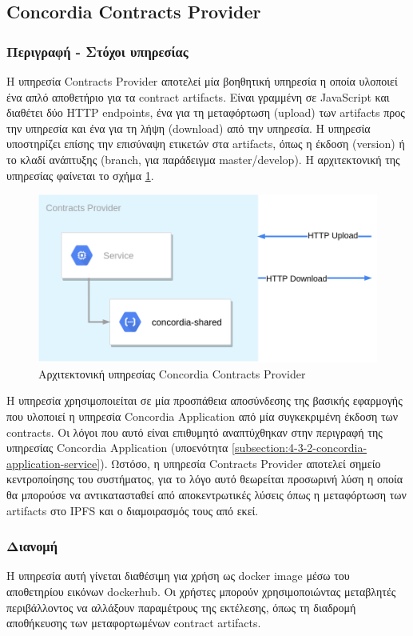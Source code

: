 \subsection{Concordia Contracts Provider} \label{subsection:4-3-5-concordia-contracts-provider-service}

\subsubsection{Περιγραφή - Στόχοι υπηρεσίας}

Η υπηρεσία Contracts Provider αποτελεί μία βοηθητική υπηρεσία η οποία υλοποιεί ένα απλό αποθετήριο για τα contract artifacts. Είναι γραμμένη σε JavaScript και διαθέτει δύο HTTP \textenglish{endpoints}, ένα για τη μεταφόρτωση (upload) των artifacts προς την υπηρεσία και ένα για τη λήψη (download) από την υπηρεσία. Η υπηρεσία υποστηρίζει επίσης την επισύναψη ετικετών στα artifacts, όπως η έκδοση (version) ή το κλαδί ανάπτυξης (branch, για παράδειγμα \textenglish{master/develop}). Η αρχιτεκτονική της υπηρεσίας φαίνεται το σχήμα \ref{figure:4-3-concordia-contracts-provider-architecture}.

\begin{figure}[H]
    \centering
    \includegraphics[width=.6\textwidth]{assets/figures/chapter-4/4.3.architecture-4.3.5.concordia-contracts-provider-architecture}
    \caption{Αρχιτεκτονική υπηρεσίας Concordia Contracts Provider}
    \label{figure:4-3-concordia-contracts-provider-architecture}
\end{figure}

Η υπηρεσία χρησιμοποιείται σε μία προσπάθεια αποσύνδεσης της βασικής εφαρμογής που υλοποιεί η υπηρεσία Concordia Application από μία συγκεκριμένη έκδοση των contracts. Οι λόγοι που αυτό είναι επιθυμητό αναπτύχθηκαν στην περιγραφή της υπηρεσίας Concordia \textenglish{Application} (υποενότητα \ref{subsection:4-3-2-concordia-application-service}). Ωστόσο, η υπηρεσία Contracts Provider αποτελεί σημείο κεντροποίησης του συστήματος, για το λόγο αυτό θεωρείται προσωρινή λύση η οποία θα μπορούσε να αντικατασταθεί από αποκεντρωτικές λύσεις όπως η μεταφόρτωση των artifacts στο IPFS και ο διαμοιρασμός τους από εκεί.

\subsubsection{Διανομή}

Η υπηρεσία αυτή γίνεται διαθέσιμη για χρήση ως docker image μέσω του αποθετηρίου εικόνων dockerhub. Οι χρήστες μπορούν χρησιμοποιώντας μεταβλητές περιβάλλοντος να αλλάξουν παραμέτρους της εκτέλεσης, όπως τη διαδρομή αποθήκευσης των μεταφορτωμένων contract artifacts.